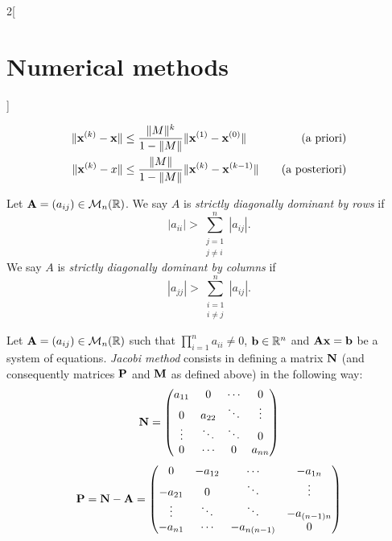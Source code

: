 \documentclass[../../../main.tex]{subfiles}
\begin{document}
\begin{multicols}{2}[\section{Numerical methods}]
\begin{prop}
    \begin{align*}
        \|\vb{x}^{(k)}-\vb{x}\|&\leq\frac{\|M\|^k}{1-\|M\|}\|\vb{x}^{(1)}-\vb{x}^{(0)}\|\quad&\text{(a priori)}\\
        \|\vb{x}^{(k)}-x\|&\leq\frac{\|M\|}{1-\|M\|}\|\vb{x}^{(k)}-\vb{x}^{(k-1)}\|\quad&\text{(a posteriori)}
    \end{align*}
\end{prop}
\begin{definition}
    Let $\vb{A}=(a_{ij})\in\mathcal{M}_n(\mathbb{R})$. We say $A$ is \textit{strictly diagonally dominant by rows} if $$|a_{ii}|>\sum_{\substack{j=1\\j\ne i}}^n|a_{ij}|.$$
    We say $A$ is \textit{strictly diagonally dominant by columns} if $$|a_{jj}|>\sum_{\substack{i=1\\i\ne j}}^n|a_{ij}|.$$
\end{definition}
\begin{definition}
    Let $\vb{A}=(a_{ij})\in\mathcal{M}_n(\mathbb{R})$ such that $\prod_{i=1}^na_{ii}\ne 0$, $\vb{b}\in\mathbb{R}^n$ and $\vb{A}\vb{x}=\vb{b}$ be a system of equations. \textit{Jacobi method} consists in defining a matrix $\vb{N}$ (and consequently matrices $\vb{P}$ and $\vb{M}$ as defined above) in the following way:
    \begin{equation*}
        \vb{N}=
        \begin{pmatrix}
            a_{11} & 0 & \cdots & 0\\
            0 & a_{22} & \ddots & \vdots\\
            \vdots & \ddots & \ddots & 0\\
            0 & \cdots & 0 & a_{nn}
        \end{pmatrix}
    \end{equation*}
    \begin{equation*}
        \vb{P}=\vb{N}-\vb{A}=
        \begin{pmatrix}
            0 & -a_{12} & \cdots & -a_{1n}\\
            -a_{21} & 0 & \ddots & \vdots\\
            \vdots & \ddots & \ddots & -a_{(n-1)n}\\
            -a_{n1} & \cdots & -a_{n(n-1)} & 0
        \end{pmatrix}
    \end{equation*}
    \begin{equation*}

\end{equation*}
\end{definition}
\end{multicols}
\end{document}

